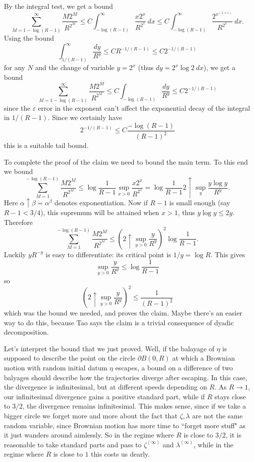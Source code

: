 \documentclass[12pt]{article}
\begin{document}
By the integral test, we get a bound
$$\sum_{M=1-\log(R-1)}^\infty \frac{M2^M}{R^{2^M}} \leq C\int_{-\log(R-1)}^\infty \frac{x2^x}{R^{2^x}} ~dx \leq C\int_{-\log(R-1)}^\infty \frac{2^{x^{(1+\varepsilon)}}}{R^{2^x}} ~dx.$$
Using the bound
$$\int_{1/(R-1)}^\infty \frac{dy}{R^y} \leq CR^{-1/(R-1)} \leq C2^{-1/(R-1)}$$
for any $N$ and the change of variable $y = 2^x$ (thus $dy = 2^x \log 2 ~dx$), we get a bound
$$\sum_{M=1-\log(R-1)}^\infty \frac{M2^M}{R^{2^M}} \leq C \int_{-\log(R-1)} \frac{dy}{R^y} \leq C2^{-1/(R-1)}$$
since the $\varepsilon$ error in the exponent can't affect the exponential decay of the integral in $1/(R-1)$. Since we certainly have
$$2^{-1/(R-1)} \leq C\frac{-\log(R-1)}{(R-1)^2}$$
this is a suitable tail bound.

To complete the proof of the claim we need to bound the main term.
To this end we bound
$$\sum_{M=1}^{-\log(R-1)} \frac{M2^M}{R^{2^M}} \leq \log\frac{1}{R-1} \sup_{x > 0} \frac{x2^x}{R^{2^x}} = \log\frac{1}{R-1} 2 \uparrow \sup_y \frac{y \log y}{R^y}.$$
Here $\alpha \uparrow \beta = \alpha^\beta$ denotes exponentiation.
Now if $R - 1$ is small enough (say $R - 1 < 3/4$), this supremum will be attained when $x > 1$, thus $y \log y \leq 2y$. Therefore
$$\sum_{M=1}^{-\log(R-1)} \frac{M2^M}{R^{2^M}} \leq \left(2\uparrow \sup_{y > 0} \frac{y}{R^y}\right)^2 \log\frac{1}{R-1} .$$
Luckily $yR^{-y}$ is easy to differentiate: its critical point is $1/y = \log R$. This gives
$$\sup_{y > 0} \frac{y}{R^y} \leq \log \frac{1}{R - 1}$$
so
$$\left(2\uparrow \sup_{y > 0} \frac{y}{R^y}\right)^2 \leq \frac{1}{(R-1)^2}$$
which was the bound we needed, and proves the claim.
Maybe there's an easier way to do this, because Tao says the claim is a trivial consequence of dyadic decomposition.

Let's interpret the bound that we just proved.
Well, if the balayage of $\eta$ is supposed to describe the point on the circle $\partial B(0, R)$ at which a Brownian motion with random initial datum $\eta$ escapes, a bound on a difference of two balyages should describe how the trajectories diverge after escaping.
In this case, the divergence is infinitesimal, but at different speeds depending on $R$.
As $R \to 1$, our infinitesimal divergence gains a positive standard part, while if $R$ stays close to $3/2$, the divergence remains infinitesimal.
This makes sense, since if we take a bigger circle we forget more and more about the fact that $\zeta,\lambda$ are not the same random variable, since Brownian motion has more time to ``forget more stuff" as it just wanders around aimlessly.
So in the regime where $R$ is close to $3/2$, it is reasonable to take standard parts and pass to $\zeta^{(\infty)}$ and $\lambda^{(\infty)}$, while in the regime where $R$ is close to $1$ this costs us dearly.
\end{document}
